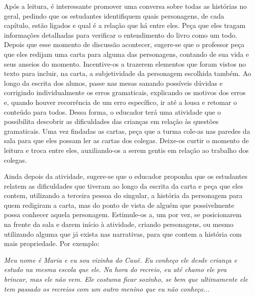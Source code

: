 \documentclass[11pt]{extarticle}
\begin{document}
Após a leitura, é interessante promover uma conversa sobre todas as histórias no geral, pedindo que os estudantes identifiquem quais personagens, de cada capítulo, estão ligados e qual é a relação que há entre eles. Peça que eles tragam informações detalhadas para verificar o entendimento do livro como um todo. Depois que esse momento de discussão acontecer, sugere-se que o professor peça que eles redijam uma carta para alguma das personagens, contando de sua vida e seus anseios do momento. Incentive-os a trazerem elementos que foram vistos no texto para incluir, na carta, a subjetividade da personagem escolhida também. Ao longo da escrita dos alunos, passe nas mesas sanando possíveis dúvidas e corrigindo individualmente os erros gramaticais, explicando os motivos dos erros e, quando houver recorrência de um erro específico, ir até a lousa e retomar o conteúdo para todos. Dessa forma, o educador terá uma atividade que o possibilita descobrir as dificuldades das crianças em relação às questões gramaticais. Uma vez findadas as cartas, peça que a turma cole-as nas paredes da sala para que eles possam ler as cartas dos colegas. Deixe-os curtir o momento de leitura e troca entre eles, auxiliando-os a serem gentis em relação ao trabalho dos colegas.


Ainda depois da atividade, sugere-se que o educador proponha que os estudantes relatem as dificuldades que tiveram ao longo da escrita da carta e peça que eles contem, utilizando a terceira pessoa do singular, a história da personagem para quem redigiram a carta, mas do ponto de vista de alguém que possivelmente possa conhecer aquela personagem. Estimule-os a, um por vez, se posicionarem na frente da sala e darem início à atividade, criando personagens, ou mesmo utilizando alguma que já exista nas narrativas, para que contem a história com mais propriedade. Por exemplo:


\textit{Meu nome é Maria e eu sou vizinha do Cauê. Eu conheço ele desde criança e estudo na mesma escola que ele. Na hora do recreio, eu até chamo ele pra brincar, mas ele não vem. Ele costuma ficar sozinho, se bem que ultimamente ele tem passado os recreios com um outro menino que eu não conheço...}

\end{document}
